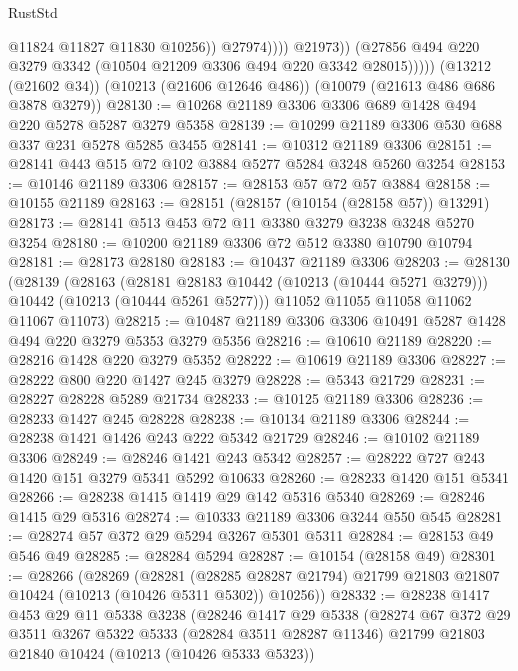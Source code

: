 \begin{lexlean}{RustStd}
\begin{coremodule}
{\begin{coremodule}
{{{{{{{{{{{{{{{{{{{{{{{{{{                          @11824
                          @11827
                          @11830
                          @10256))
                      @27974))))
              @21973))
          (@27856 @494 @220 @3279 @3342 (@10504 @21209 @3306 @494 @220 @3342 @28015)))))
    (@13212 (@21602 @34))
    (@10213 (@21606 @12646 @486))
    (@10079 (@21613 @486 @686 @3878 @3279))
@28130 := @10268 @21189 @3306 @3306 @689 @1428 @494 @220 @5278 @5287 @3279 @5358
@28139 := @10299 @21189 @3306 @530 @688 @337 @231 @5278 @5285 @3455
@28141 := @10312 @21189 @3306
@28151 := @28141 @443 @515 @72 @102 @3884 @5277 @5284 @3248 @5260 @3254
@28153 := @10146 @21189 @3306
@28157 := @28153 @57 @72 @57 @3884
@28158 := @10155 @21189
@28163 := @28151 (@28157 (@10154 (@28158 @57)) @13291)
@28173 := @28141 @513 @453 @72 @11 @3380 @3279 @3238 @3248 @5270 @3254
@28180 := @10200 @21189 @3306 @72 @512 @3380 @10790 @10794
@28181 := @28173 @28180
@28183 := @10437 @21189 @3306
@28203 := @28130
    (@28139
      (@28163
        (@28181 @28183 @10442 (@10213 (@10444 @5271 @3279)))
        @10442
        (@10213 (@10444 @5261 @5277)))
      @11052
      @11055
      @11058
      @11062
      @11067
      @11073)
@28215 := @10487 @21189 @3306 @3306 @10491 @5287 @1428 @494 @220 @3279 @5353 @3279 @5356
@28216 := @10610 @21189
@28220 := @28216 @1428 @220 @3279 @5352
@28222 := @10619 @21189 @3306
@28227 := @28222 @800 @220 @1427 @245 @3279
@28228 := @5343 @21729
@28231 := @28227 @28228 @5289 @21734
@28233 := @10125 @21189 @3306
@28236 := @28233 @1427 @245 @28228
@28238 := @10134 @21189 @3306
@28244 := @28238 @1421 @1426 @243 @222 @5342 @21729
@28246 := @10102 @21189 @3306
@28249 := @28246 @1421 @243 @5342
@28257 := @28222 @727 @243 @1420 @151 @3279 @5341 @5292 @10633
@28260 := @28233 @1420 @151 @5341
@28266 := @28238 @1415 @1419 @29 @142 @5316 @5340
@28269 := @28246 @1415 @29 @5316
@28274 := @10333 @21189 @3306 @3244 @550 @545
@28281 := @28274 @57 @372 @29 @5294 @3267 @5301 @5311
@28284 := @28153 @49 @546 @49
@28285 := @28284 @5294
@28287 := @10154 (@28158 @49)
@28301 := @28266
    (@28269
      (@28281
        (@28285 @28287 @21794)
        @21799
        @21803
        @21807
        @10424
        (@10213 (@10426 @5311 @5302))
        @10256))
@28332 := @28238
    @1417
    @453
    @29
    @11
    @5338
    @3238
    (@28246
      @1417
      @29
      @5338
      (@28274
        @67
        @372
        @29
        @3511
        @3267
        @5322
        @5333
        (@28284 @3511 @28287 @11346)
        @21799
        @21803
        @21840
        @10424
        (@10213 (@10426 @5333 @5323))
}}}}}}}}}}}}}}}}}}}}}}}}}}
\end{coremodule}}
\end{coremodule}
\end{lexlean}

